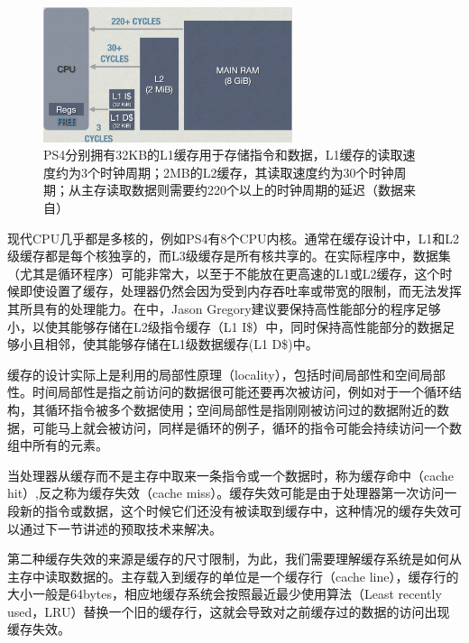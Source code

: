 \begin{figure}
	\sidecaption
	\includegraphics[width=0.65\textwidth]{figures/rp/cpu-cache}
	\caption{PS4分别拥有32KB的L1缓存用于存储指令和数据，L1缓存的读取速度约为3个时钟周期；2MB的L2缓存，其读取速度约为30个时钟周期；从主存读取数据则需要约220个以上的时钟周期的延迟（数据来自\cite{a:DoggedDetermination:TechnologyandProcessatNaughtyDogInc.}）}
	\label{f:rp-ps4-cache}
\end{figure}

现代CPU几乎都是多核的，例如PS4\cite{a:PS4SystemArchitecture}有8个CPU内核。通常在缓存设计中，L1和L2级缓存都是每个核独享的，而L3级缓存是所有核共享的。在实际程序中，数据集（尤其是循环程序）可能非常大，以至于不能放在更高速的L1或L2缓存，这个时候即使设置了缓存，处理器仍然会因为受到内存吞吐率或带宽的限制，而无法发挥其所具有的处理能力。在\cite{a:DoggedDetermination:TechnologyandProcessatNaughtyDogInc.}中，Jason Gregory建议要保持高性能部分的程序足够小，以使其能够存储在L2级指令缓存（L1 I\$）中，同时保持高性能部分的数据足够小且相邻，使其能够存储在L1级数据缓存(L1 D\$)中。

缓存的设计实际上是利用的局部性原理（locality），包括时间局部性和空间局部性。时间局部性是指之前访问的数据很可能还要再次被访问，例如对于一个循环结构，其循环指令被多个数据使用；空间局部性是指刚刚被访问过的数据附近的数据，可能马上就会被访问，同样是循环的例子，循环的指令可能会持续访问一个数组中所有的元素。

当处理器从缓存而不是主存中取来一条指令或一个数据时，称为缓存命中（cache hit）,反之称为缓存失效（cache miss）。缓存失效可能是由于处理器第一次访问一段新的指令或数据，这个时候它们还没有被读取到缓存中，这种情况的缓存失效可以通过下一节讲述的预取技术来解决。

第二种缓存失效的来源是缓存的尺寸限制，为此，我们需要理解缓存系统是如何从主存中读取数据的。主存载入到缓存的单位是一个缓存行（cache line），缓存行的大小一般是64bytes，相应地缓存系统会按照最近最少使用算法（Least recently used，LRU）替换一个旧的缓存行，这就会导致对之前缓存过的数据的访问出现缓存失效。


